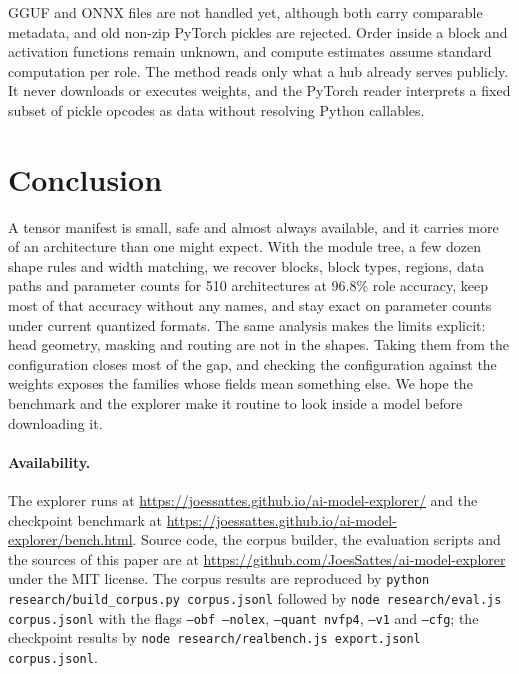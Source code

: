 \documentclass[11pt]{article}
\newcommand{\tn}[1]{\texttt{#1}}
\begin{document}
GGUF and ONNX files are not handled yet, although both carry comparable metadata, and old non-zip PyTorch pickles are rejected. Order inside a block and activation functions remain unknown, and compute estimates assume standard computation per role. The method reads only what a hub already serves publicly. It never downloads or executes weights, and the PyTorch reader interprets a fixed subset of pickle opcodes as data without resolving Python callables.

\section{Conclusion}

A tensor manifest is small, safe and almost always available, and it carries more of an architecture than one might expect. With the module tree, a few dozen shape rules and width matching, we recover blocks, block types, regions, data paths and parameter counts for 510 architectures at 96.8\% role accuracy, keep most of that accuracy without any names, and stay exact on parameter counts under current quantized formats. The same analysis makes the limits explicit: head geometry, masking and routing are not in the shapes. Taking them from the configuration closes most of the gap, and checking the configuration against the weights exposes the families whose fields mean something else. We hope the benchmark and the explorer make it routine to look inside a model before downloading it.

\paragraph{Availability.}\sloppy The explorer runs at \url{https://joessattes.github.io/ai-model-explorer/} and the checkpoint benchmark at \url{https://joessattes.github.io/ai-model-explorer/bench.html}. Source code, the corpus builder, the evaluation scripts and the sources of this paper are at \url{https://github.com/JoesSattes/ai-model-explorer} under the MIT license. The corpus results are reproduced by \tn{python research/build\_corpus.py corpus.jsonl} followed by \tn{node research/eval.js corpus.jsonl} with the flags \tn{--obf --nolex}, \tn{--quant nvfp4}, \tn{--v1} and \tn{--cfg}; the checkpoint results by \tn{node research/realbench.js export.jsonl corpus.jsonl}.




\appendix
\end{document}
